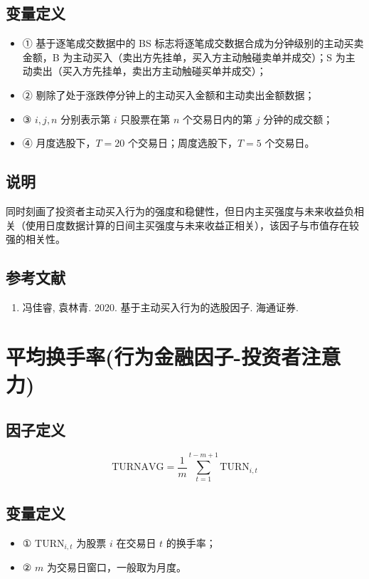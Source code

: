\documentclass{article}
\begin{document}
\subsection{变量定义}
\begin{itemize}
    \item ① 基于逐笔成交数据中的 BS 标志将逐笔成交数据合成为分钟级别的主动买卖金额，B 为主动买入（卖出方先挂单，买入方主动触碰卖单并成交）；S 为主动卖出（买入方先挂单，卖出方主动触碰买单并成交）；
    \item ② 剔除了处于涨跌停分钟上的主动买入金额和主动卖出金额数据；
    \item ③ \( i, j, n \) 分别表示第 \( i \) 只股票在第 \( n \) 个交易日内的第 \( j \) 分钟的成交额；
    \item ④ 月度选股下，\( T = 20 \) 个交易日；周度选股下，\( T = 5 \) 个交易日。
\end{itemize}

\subsection{说明}
同时刻画了投资者主动买入行为的强度和稳健性，但日内主买强度与未来收益负相关（使用日度数据计算的日间主买强度与未来收益正相关），该因子与市值存在较强的相关性。

\subsection{参考文献}
\begin{enumerate}
    \item 冯佳睿, 袁林青. 2020. 基于主动买入行为的选股因子. 海通证券.
\end{enumerate}

\section{平均换手率(行为金融因子-投资者注意力)}

\subsection{因子定义}
\begin{equation}
    \mathrm{TURNAVG} = \frac{1}{m} \sum_{t=1}^{t-m+1} \mathrm{TURN}_{i,t}
\end{equation}

\subsection{变量定义}
\begin{itemize}
    \item ① \( \mathrm{TURN}_{i,t} \) 为股票 \( i \) 在交易日 \( t \) 的换手率；
    \item ② \( m \) 为交易日窗口，一般取为月度。
\end{itemize}
\end{document}
